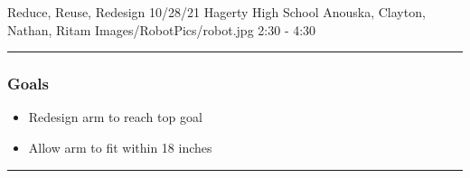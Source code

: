 \insertmeeting 
	{Reduce, Reuse, Redesign} 
	{10/28/21}
	{Hagerty High School}
	{Anouska, Clayton, Nathan, Ritam}
	{Images/RobotPics/robot.jpg}
	{2:30 - 4:30}
	
\noindent\hfil\rule{\textwidth}{.4pt}\hfil
\subsubsection*{Goals}
\begin{itemize}
    \item Redesign arm to reach top goal
    \item Allow arm to fit within 18 inches 

\end{itemize} 

\noindent\hfil\rule{\textwidth}{.4pt}\hfil

